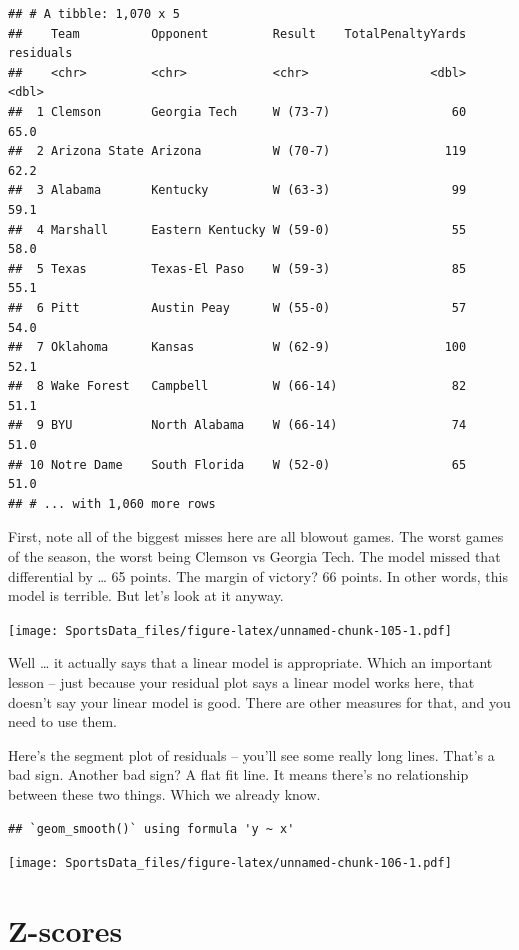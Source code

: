 \documentclass[
]{book}
\begin{document}
\begin{verbatim}
## # A tibble: 1,070 x 5
##    Team          Opponent         Result    TotalPenaltyYards residuals
##    <chr>         <chr>            <chr>                 <dbl>     <dbl>
##  1 Clemson       Georgia Tech     W (73-7)                 60      65.0
##  2 Arizona State Arizona          W (70-7)                119      62.2
##  3 Alabama       Kentucky         W (63-3)                 99      59.1
##  4 Marshall      Eastern Kentucky W (59-0)                 55      58.0
##  5 Texas         Texas-El Paso    W (59-3)                 85      55.1
##  6 Pitt          Austin Peay      W (55-0)                 57      54.0
##  7 Oklahoma      Kansas           W (62-9)                100      52.1
##  8 Wake Forest   Campbell         W (66-14)                82      51.1
##  9 BYU           North Alabama    W (66-14)                74      51.0
## 10 Notre Dame    South Florida    W (52-0)                 65      51.0
## # ... with 1,060 more rows
\end{verbatim}

First, note all of the biggest misses here are all blowout games. The worst games of the season, the worst being Clemson vs Georgia Tech. The model missed that differential by \ldots{} 65 points. The margin of victory? 66 points. In other words, this model is terrible. But let's look at it anyway.

\texttt{[image: SportsData\_files/figure-latex/unnamed-chunk-105-1.pdf]}

Well \ldots{} it actually says that a linear model is appropriate. Which an important lesson -- just because your residual plot says a linear model works here, that doesn't say your linear model is good. There are other measures for that, and you need to use them.

Here's the segment plot of residuals -- you'll see some really long lines. That's a bad sign. Another bad sign? A flat fit line. It means there's no relationship between these two things. Which we already know.

\begin{verbatim}
## `geom_smooth()` using formula 'y ~ x'
\end{verbatim}

\texttt{[image: SportsData\_files/figure-latex/unnamed-chunk-106-1.pdf]}

\hypertarget{z-scores}{%
\chapter{Z-scores}\label{z-scores}}
\end{document}
